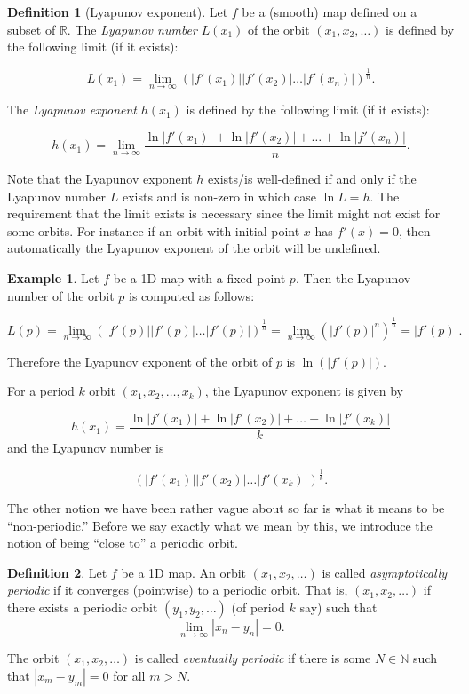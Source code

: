 \documentclass[
  a4paper,
  oneside,
  final]{krantz}
\newcommand{\R}{\mathbb{R}}
\newcommand{\N}{\mathbb{N}}
\theoremstyle{definition}
\newtheorem{definition}{Definition}[chapter]
\theoremstyle{definition}
\newtheorem{example}{Example}[chapter]
\theoremstyle{definition}
\theoremstyle{definition}
\theoremstyle{remark}
\begin{document}
\begin{definition}[Lyapunov exponent]
\protect\hypertarget{def:Lyapunovexponent}{}\label{def:Lyapunovexponent}Let \(f\) be a (smooth) map defined on a subset of \(\R\). The \emph{Lyapunov number} \(L(x_1)\) of the orbit \((x_1, x_2, \ldots )\) is defined by the following limit (if it exists):

\[ L(x_1) = \lim_{n\to \infty}(|f'(x_1)| |f'(x_2)|\ldots |f'(x_n)|)^{\frac{1}{n}} .\]

The \emph{Lyapunov exponent} \(h(x_1)\) is defined by the following limit (if it exists):

\[ h(x_1) = \lim_{n \to \infty} \dfrac{\ln|f'(x_1)| + \ln|f'(x_2)|+ \ldots + \ln|f'(x_n)|}{n}.\]
\end{definition}

Note that the Lyapunov exponent \(h\) exists/is well-defined if and only if the Lyapunov number \(L\) exists and is non-zero in which case \(\ln L = h\). The requirement that the limit exists is necessary since the limit might not exist for some orbits. For instance if an orbit with initial point \(x\) has \(f'(x) = 0\), then automatically the Lyapunov exponent of the orbit will be undefined.

\begin{example}

Let \(f\) be a 1D map with a fixed point \(p\). Then the Lyapunov number of the orbit \(p\) is computed as follows:

\[ L(p) = \lim_{n \to \infty} (|f'(p)||f'(p)| \ldots |f'(p)|)^{\frac{1}{n}}  = \lim_{n \to \infty} (|f'(p)|^n)^{\frac{1}{n}} = |f'(p)|.\]

Therefore the Lyapunov exponent of the orbit of \(p\) is \(\ln(|f'(p)|)\).

For a period \(k\) orbit \((x_1, x_2, \ldots, x_{k})\), the Lyapunov exponent is given by

\[h(x_1) = \dfrac{\ln|f'(x_1)| + \ln|f'(x_2)|+ \ldots + \ln|f'(x_k)|}{k}\] and the Lyapunov number is

\[(|f'(x_1)| |f'(x_2)|\ldots |f'(x_k)|)^{\frac{1}{k}}.\]
\end{example}

The other notion we have been rather vague about so far is what it means to be ``non-periodic.'' Before we say exactly what we mean by this, we introduce the notion of being ``close to'' a periodic orbit.

\begin{definition}
\protect\hypertarget{def:asymptoticallyperiodic}{}\label{def:asymptoticallyperiodic}Let \(f\) be a 1D map. An orbit \((x_1, x_2, \ldots)\) is called \emph{asymptotically periodic} if it converges (pointwise) to a periodic orbit. That is, \((x_1, x_2, \ldots)\) if there exists a periodic orbit \((y_1, y_2, \ldots)\) (of period \(k\) say) such that
\[ \lim_{n\to \infty} |x_n - y_n| = 0. \]

The orbit \((x_1, x_2, \ldots)\) is called \emph{eventually periodic} if there is some \(N \in \N\) such that \(|x_m - y_m| = 0\) for all \(m> N\).
\end{definition}
\end{document}
